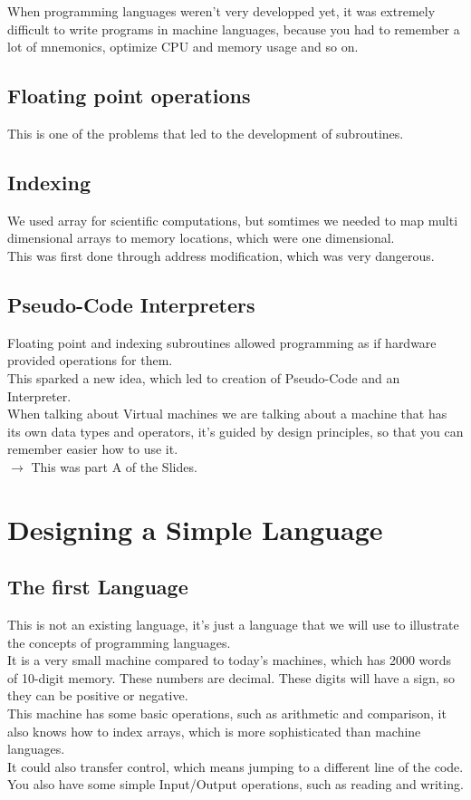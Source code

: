      When programming languages weren't very developped yet, it was extremely difficult to write programs in machine languages, because you had to remember a lot of mnemonics, optimize CPU and memory usage and so on.\\

     \subsection{Floating point operations}
     This is one of the problems that led to the development of subroutines.\\

     \subsection{Indexing}
     We used array for scientific computations, but somtimes we needed to map multi dimensional arrays to memory locations, which were one dimensional.\\
     This was first done through address modification, which was very dangerous.\\

     \subsection{Pseudo-Code Interpreters}
     Floating point and indexing subroutines allowed programming as if hardware provided operations for them.\\
     This sparked a new idea, which led to creation of Pseudo-Code and an Interpreter.\\
     When talking about Virtual machines we are talking about a machine that has its own data types and operators, it's guided by design principles, so that you can remember easier how to use it.\\
     $\rightarrow$ This was part A of the Slides.


     \section{Designing a Simple Language}
     \subsection{The first Language}
     This is not an existing language, it's just a language that we will use to illustrate the concepts of programming languages.\\
     It is a very small machine compared to today's machines, which has 2000 words of 10-digit memory. These numbers are decimal.
     These digits will have a sign, so they can be positive or negative.\\
     This machine has some basic operations, such as arithmetic and comparison, it also knows how to index arrays, which is more sophisticated than machine languages.\\
     It could also transfer control, which means jumping to a different line of the code.\\
     You also have some simple Input/Output operations, such as reading and writing.\\

